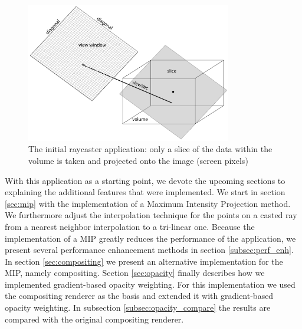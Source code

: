 \begin{figure}[h!]
    \centering
    \captionsetup{justification=centering,margin=0.5cm}
    \includegraphics[width=0.8\textwidth]{img/raycaster0.pdf}
    \caption{The initial raycaster application: only a slice of the data within the volume is taken and projected onto the image (screen pixels)}
    \label{fig:raycaster0}
\end{figure}

With this application as a starting point, we devote the upcoming sections to explaining the additional features that were implemented. We start in section \ref{sec:mip} with the implementation of a Maximum Intensity Projection method. We furthermore adjust the interpolation technique for the points on a casted ray from a nearest neighbor interpolation to a tri-linear one. Because the implementation of a MIP greatly reduces the performance of the application, we present several performance enhancement methods in section \ref{subsec:perf_enh}. In section \ref{sec:compositing} we present an alternative implementation for the MIP, namely compositing. Section \ref{sec:opacity} finally describes how we implemented gradient-based opacity weighting. For this implementation we used the compositing renderer as the basis and extended it with gradient-based opacity weighting. In subsection \ref{subsec:opacity_compare} the results are compared with the original compositing renderer.
